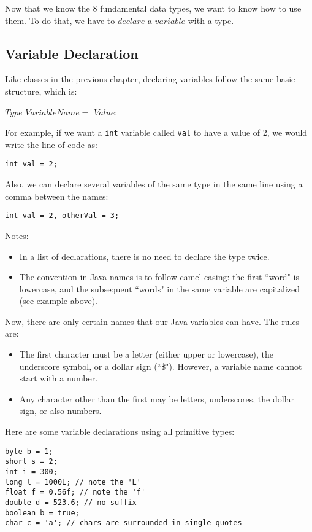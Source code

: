 \noindent Now that we know the 8 fundamental data types, we want to know how to use them. To do that, we have to $declare$ a $variable$ with a type.

\subsection{Variable Declaration}
Like classes in the previous chapter, declaring variables follow the same basic structure, which is:
\begin{center}
$Type$ $VariableName = $ $Value;$
\end{center}

\noindent For example, if we want a \verb|int| variable called \verb|val| to have a value of 2, we would write the line of code as:

\begin{lstlisting}
int val = 2;
\end{lstlisting}

\noindent Also, we can declare several variables of the same type in the same line using a comma between the names:
\begin{lstlisting}
int val = 2, otherVal = 3;
\end{lstlisting}
Notes: 
\begin{itemize}
\item In a list of declarations, there is no need to declare the type twice.
\item The convention in Java names is to follow camel casing: the first ``word" is lowercase, and the subsequent ``words" in the same variable are capitalized (see example above).
\end{itemize}

\noindent Now, there are only certain names that our Java variables can have. The rules are:
\begin{itemize}
\item The first character must be a letter (either upper or lowercase), the underscore symbol, or a dollar sign (``\$"). However, a variable name cannot start with a number. 
\item Any character other than the first may be letters, underscores, the dollar sign, or also numbers. 
\end{itemize}

\noindent Here are some variable declarations using all primitive types:
\begin{lstlisting}
byte b = 1;
short s = 2;
int i = 300;
long l = 1000L; // note the 'L'
float f = 0.56f; // note the 'f'
double d = 523.6; // no suffix
boolean b = true;
char c = 'a'; // chars are surrounded in single quotes
\end{lstlisting}

